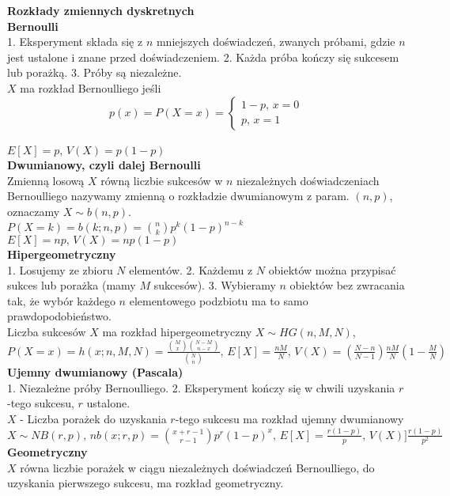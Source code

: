 \documentclass[10pt,landscape,a4paper,notitlepage]{article}
\begin{document}
\begin{multicols*}{4}
        \noindent\textbf{\large Rozkłady zmiennych dyskretnych}\\
        \textbf{Bernoulli}\\
        1. Eksperyment składa się z $n$ mniejszych doświadczeń, zwanych próbami,
        gdzie $n$ jest ustalone i znane przed doświadczeniem.
        2. Każda próba kończy się sukcesem lub porażką.
        3. Próby są niezależne.\\
        $X$ ma rozkład Bernoulliego jeśli
        \[
            p(x)=P(X=x)=
            \begin{cases}
                1-p,\,x=0\\
                p,\,x=1
            \end{cases}
        \]\\
        $E[X]=p,\,V(X)=p(1-p)$\\
        \textbf{Dwumianowy, czyli dalej Bernoulli}\\
        Zmienną losową $X$ równą liczbie sukcesów w $n$ niezależnych doświadczeniach Bernoulliego nazywamy zmienną o rozkładzie dwumianowym z param. $(n,p)$, oznaczamy $X\sim b(n,p)$.\\
        $P(X=k)=b(k;n,p)=\binom{n}{k}p^k(1-p)^{n-k}$\\
        $E[X]=np,\,V(X)=np(1-p)$\\
        \textbf{Hipergeometryczny}\\
        1. Losujemy ze zbioru $N$ elementów.
        2. Każdemu z $N$ obiektów można przypisać sukces lub porażka (mamy $M$ sukcesów).
        3. Wybieramy $n$ obiektów bez zwracania tak, że wybór każdego $n$ elementowego podzbiotu ma to samo prawdopodobieństwo.\\
        Liczba sukcesów $X$ ma rozkład hipergeometryczny $X\sim HG(n,M,N)$, $P(X=x)=h(x;n,M,N)=\frac{\binom{M}{x}\binom{N-M}{n-x}}{\binom{N}{n}},\,E[X]=\frac{nM}{N},\,V(X)=\left(\frac{N-n}{N-1}\right)\frac{nM}{N}\left(1-\frac{M}{N}\right)$\\
        \textbf{Ujemny dwumianowy (Pascala)}\\
        1. Niezależne próby Bernoulliego. 2. Eksperyment kończy się w chwili uzyskania $r$-tego sukcesu, $r$ ustalone.\\
        $X$ - Liczba porażek do uzyskania $r$-tego sukcesu ma rozkład ujemny dwumianowy $X\sim NB(r,p),\,nb(x;r,p)=\binom{x+r-1}{r-1}p^r(1-p)^x,\,E[X]=\frac{r(1-p)}{p},\,V(X)]\frac{r(1-p)}{p^2}$\\
        \textbf{Geometryczny}\\
        $X$ równa liczbie porażek w ciągu niezależnych doświadczeń Bernoulliego, do uzyskania pierwszego sukcesu, ma rozkład geometryczny.\\

\end{multicols*}
\end{document}
